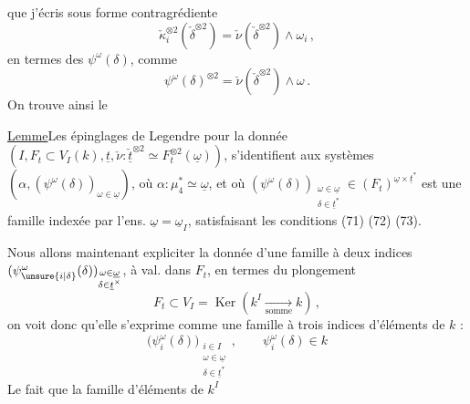 que j'écris sous forme contragrédiente
\[
\check\kappa_i^{\otimes2}(\check\delta^{\otimes2})=
\check\nu(\check\delta^{\otimes2})\mathbin{\wedge}\omega_i\,,
\]
en termes des $\psi^\omega(\delta)$, comme
\[
\psi^\omega(\delta)^{\otimes2}=\check\nu(\check\delta^{\otimes2})\mathbin{\wedge}\omega\,. \tag*{(73)}
\]
On trouve ainsi le

\uline{Lemme}\quad Les épinglages de Legendre pour la donnée $(I,F_t\subset V_I(k),\underline t,\check\nu:\underline{\check t}^{\otimes2}\simeq F_t^{\otimes2}(\underline\omega))$, s'identifient aux systèmes $(\alpha,(\psi^\omega(\delta))_{\omega\in\underline\omega})$, où $\alpha:\mu_4^*\simeq\underline\omega$, et où $(\psi^\omega(\delta))_{\substack{\omega\in\underline\omega\\\delta\in\underline t^*}}\in(F_t)^{\underline\omega\times\underline t^*}$  est une famille indexée par l'ens.    $\underline\omega=\underline\omega_I$, satisfaisant les conditions (71) (72) (73).

Nous allons maintenant expliciter la donnée d'une famille à deux indices $(\psi_{\unsure{i|\delta}}^\omega(\delta))_{\substack{\omega\in\underline\omega\\\delta\in\underline t^\times}}$, à val. dans $F_t$, en termes du plongement
\[
F_t\subset V_I=\operatorname{Ker}(k^I\xrightarrow[\text{somme}]{}k)\,,
\]
on voit donc qu'elle s'exprime comme une famille à trois indices d'éléments de $k$ :
\[
\bigl(\psi_i^\omega(\delta)\bigr)_{\substack{i\in I\\\omega\in\underline\omega\\\delta\in\underline t^*}}\,,\qquad
\psi_i^\omega(\delta)\in k \tag*{(74)}
\]
Le fait que la famille d'éléments de $k^I$
